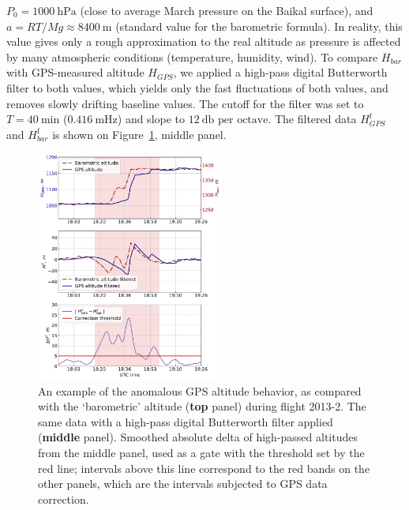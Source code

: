 \documentclass[universe,article,accept,moreauthors,pdftex]{Definitions/mdpi}
\begin{document}
 \mbox{$P_0 = 1000~\textrm{hPa}$} (close to average March pressure on the Baikal surface), and $a = {RT}/{Mg} \approx 8400~\textrm{m}$ (standard value for the barometric formula). In reality, this value gives only a rough approximation to the real altitude as pressure is affected by many atmospheric conditions (temperature, humidity, wind). To compare $H_{bar}$ with GPS-measured altitude $H_{GPS}$, we applied a high-pass digital Butterworth filter to both values, which yields only the fast fluctuations of both values, and removes slowly drifting baseline values. The cutoff for the filter was set to $T=40~\textrm{min}$ ($0.416~\textrm{mHz}$) and slope to $12~\textrm{db per octave}$. The filtered data $H_{GPS}^{\textrm{f}}$ and $H_{bar}^{\textrm{f}}$ is shown on Figure~\ref{fig:h_corr}, middle panel.

\begin{figure}[H]
    \includegraphics[width=0.55\textwidth]{figs/2013-2_gps_correction.pdf} 
    \caption{An example of the anomalous GPS altitude behavior, as compared with the `barometric' altitude (\textbf{top} panel) during flight 2013-2. The same data with a high-pass digital Butterworth filter applied (\textbf{middle} panel). Smoothed absolute delta of high-passed altitudes from the middle panel, used as a gate with the threshold set by the red line; intervals above this line correspond to the red bands on the other panels, which are the intervals subjected to GPS data correction.}
\label{fig:h_corr}
\end{figure}
\end{document}
